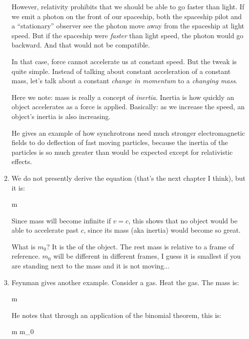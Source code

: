 \begin{enumerate}
  However, relativity prohibits that we should be able to go faster than
  light. If we emit a photon on the front of our spaceship, both the
  spaceship pilot and a ``stationary'' observer see the photon move away
  from the spaceship at light speed. But if the spaceship were
  \emph{faster} than light speed, the photon would go backward. And that
  would not be compatible.

  In that case, force cannot accelerate us at constant speed. But the
  tweak is quite simple. Instead of talking about constant acceleration
  of a constant mass, let's talk about a constant \emph{change in
  momentum} to a \emph{changing mass}.

  Here we note: mass is really a concept of \emph{inertia}. Inertia is
  how quickly an object accelerates as a force is applied. Basically: as
  we increase the speed, an object's inertia is also increasing.

  He gives an example of how synchrotrons need much stronger
  electromagnetic fields to do deflection of fast moving particles,
  because the inertia of the particles is so much greater than would be
  expected except for relativistic effects.

  \item We do not presently derive the equation (that's the next chapter
  I think), but it is:

  \begin{nedqn}
    m
  \eqcol
  \end{nedqn}

  Since mass will become infinite if $v = c$, this shows that no object
  would be able to accelerate past $c$, since its mass (aka inertia)
  would become so great.

  What is $m_0$? It is the  of the object. The rest
  mass is relative to a frame of reference. $m_0$ will be different in
  different frames, I guess it is smallest if you are standing next to
  the mass and it is not moving...

  \item Feynman gives another example. Consider a gas. Heat the gas. The
  mass is:

  \begin{nedqn}
    m
  \eqcol
  \end{nedqn}

  He notes that through an application of the binomial theorem, this is:

  \begin{nedqn}
    m
  \approxcol
    m_0 
  \end{nedqn}


\end{enumerate}
